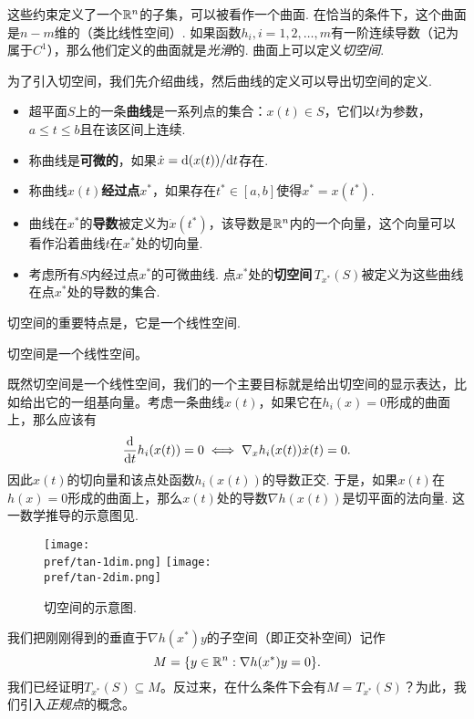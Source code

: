 这些约束定义了一个$\mathbb{R}^n$的子集，可以被看作一个曲面. 在恰当的条件下，这个曲面是$n-m$维的（类比线性空间）. 如果函数$h_i,i=1,2,\dots,m$有一阶连续导数（记为属于$C^1$），那么他们定义的曲面就是\emph{光滑}的. 曲面上可以定义\emph{切空间}.
    
为了引入切空间，我们先介绍曲线，然后曲线的定义可以导出切空间的定义. 
\begin{definition}[曲线与切空间]
\begin{itemize}
    \item 超平面$S$上的一条\textbf{曲线}是一系列点的集合：${x}(t)\in S$，它们以$t$为参数，$a\le t\le b$且在该区间上连续. 
    \item 称曲线是\textbf{可微的}，如果$\dot{{x}}=\mathrm{d}({x}(t))/\mathrm{d} t$存在. 
    \item 称曲线${x}(t)$\textbf{经过点${x^\ast}$}，如果存在$t^\ast\in[a,b]$使得${x^\ast}={x}(t^\ast)$. 
    \item 曲线在${x^\ast}$的\textbf{导数}被定义为$\dot{{x}}(t^\ast)$，该导数是$\mathbb{R}^n$内的一个向量，这个向量可以看作沿着曲线$t$在$x^\ast$处的切向量.
    \item 考虑所有$S$内经过点${x^\ast}$的可微曲线. 点${x^\ast}$处的\textbf{切空间}\,$T_{x^\ast}(S)$被定义为这些曲线在点${x^\ast}$处的导数的集合. 
\end{itemize}
\end{definition}

切空间的重要特点是，它是一个线性空间.
\begin{lemma}\label{lemma:tan-space}
    切空间是一个线性空间。
\end{lemma}

既然切空间是一个线性空间，我们的一个主要目标就是给出切空间的显示表达，比如给出它的一组基向量。考虑一条曲线$x(t)$，如果它在$h_i(x)=0$形成的曲面上，那么应该有
    \[\frac{\mathrm{d}}{\mathrm{d} t}h_i(x(t))=0\iff \nabla_x h_i(x(t))\dot{x}(t)=0.\]
因此${x}(t)$的切向量和该点处函数$h_i({x}(t))$的导数正交. 于是，如果$x(t)$在$h(x)=0$形成的曲面上，那么${x}(t)$处的导数$\nabla h(x(t))$是切平面的法向量. 这一数学推导的示意图见.

\begin{figure}
\centering
    \texttt{[image: \\pref/tan-1dim.png]}
\centering
    \texttt{[image: \\pref/tan-2dim.png]}
\caption{切空间的示意图.}
\label{fig:tangent-space}
\end{figure}
    
我们把刚刚得到的垂直于$\nabla {h(x^\ast)y}$的子空间（即正交补空间）记作
    \[M=\{{y}\in\mathbb{R}^n:\nabla {h(x^\ast)y}=0\}.\]
我们已经证明$T_{x^\ast}(S)\subseteq M$。反过来，在什么条件下会有$M=T_{x^\ast}(S)$？为此，我们引入\emph{正规点}的概念。

